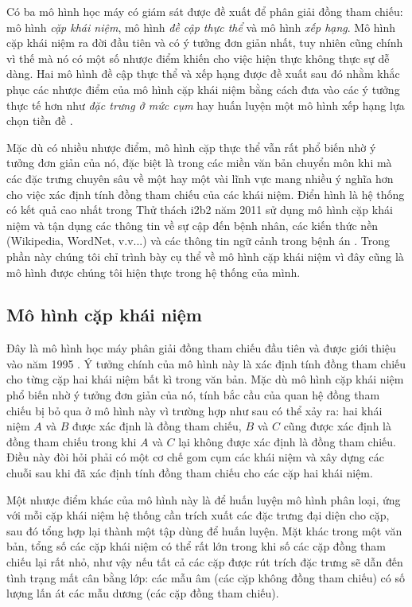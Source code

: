 Có ba mô hình học máy có giám sát được đề xuất để phân giải đồng tham chiếu: mô hình \emph{cặp khái niệm}, mô hình \emph{đề cập thực thể} và mô hình \emph{xếp hạng}. Mô hình cặp khái niệm ra đời đầu tiên và có ý tưởng đơn giản nhất, tuy nhiên cũng chính vì thế mà nó có một số nhược điểm khiến cho việc hiện thực không thực sự dễ dàng. Hai mô hình đề cập thực thể và xếp hạng được đề xuất sau đó nhằm khắc phục các nhược điểm của mô hình cặp khái niệm bằng cách đưa vào các ý tưởng thực tế hơn như \emph{đặc trưng ở mức cụm} \cite{Yang2004} hay huấn luyện một mô hình xếp hạng lựa chọn tiền đề \cite{Yang2003}.

Mặc dù có nhiều nhược điểm, mô hình cặp thực thể vẫn rất phổ biến nhờ ý tưởng đơn giản của nó, đặc biệt là trong các miền văn bản chuyển môn khi mà các đặc trưng chuyên sâu về một hay một vài lĩnh vực mang nhiều ý nghĩa hơn cho việc xác định tính đồng tham chiếu của các khái niệm. Điển hình là hệ thống có kết quả cao nhất trong Thử thách i2b2 năm 2011 sử dụng mô hình cặp khái niệm và tận dụng các thông tin về sự cập đến bệnh nhân, các kiến thức nền (Wikipedia, WordNet, v.v...) và các thông tin ngữ cảnh trong bệnh án \cite{YanXu2012}. Trong phần này chúng tôi chỉ trình bày cụ thể về mô hình cặp khái niệm vì đây cũng là mô hình được chúng tôi hiện thực trong hệ thống của mình.

\subsection*{Mô hình cặp khái niệm}
Đây là mô hình học máy phân giải đồng tham chiếu đầu tiên và được giới thiệu vào năm 1995 \cite{Aone&Bennett1995}. Ý tưởng chính của mô hình này là xác định tính đồng tham chiếu cho từng cặp hai khái niệm bất kì trong văn bản. Mặc dù mô hình cặp khái niệm phổ biến nhờ ý tưởng đơn giản của nó, tính bắc cầu của quan hệ đồng tham chiếu bị bỏ qua ở mô hình này vì trường hợp như sau có thể xảy ra: hai khái niệm $A$ và $B$ được xác định là đồng tham chiếu, $B$ và $C$ cũng được xác định là đồng tham chiếu trong khi $A$ và $C$ lại không được xác định là đồng tham chiếu. Điều này đòi hỏi phải có một cơ chế gom cụm các khái niệm và xây dựng các chuỗi sau khi đã xác định tính đồng tham chiếu cho các cặp hai khái niệm.

Một nhược điểm khác của mô hình này là để huấn luyện mô hình phân loại, ứng với mỗi cặp khái niệm hệ thống cần trích xuất các đặc trưng đại diện cho cặp, sau đó tổng hợp lại thành một tập dùng để huấn luyện. Mặt khác trong một văn bản, tổng số các cặp khái niệm có thể rất lớn trong khi số các cặp đồng tham chiếu lại rất nhỏ, như vậy nếu tất cả các cặp được rút trích đặc trưng sẽ dẫn đến tình trạng mất cân bằng lớp: các mẫu âm (các cặp không đồng tham chiếu) có số lượng lấn át các mẫu dương (các cặp đồng tham chiếu).

